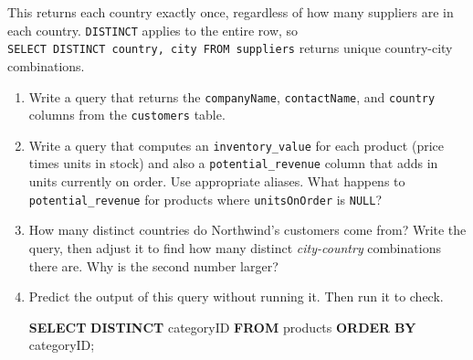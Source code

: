 \documentclass[
  letterpaper,
  DIV=11,
  numbers=noendperiod]{scrreprt}
\newenvironment{Shaded}{\begin{snugshade}}{\end{snugshade}}
\newcommand{\KeywordTok}[1]{\textcolor[rgb]{0.00,0.23,0.31}{\textbf{#1}}}
\newcommand{\NormalTok}[1]{\textcolor[rgb]{0.00,0.23,0.31}{#1}}
\begin{document}
This returns each country exactly once, regardless of how many suppliers
are in each country. \texttt{DISTINCT} applies to the entire row, so
\texttt{SELECT\ DISTINCT\ country,\ city\ FROM\ suppliers} returns
unique country-city combinations.

\begin{tcolorbox}[enhanced jigsaw, opacitybacktitle=0.6, arc=.35mm, colback=white, bottomtitle=1mm, opacityback=0, toprule=.15mm, left=2mm, colbacktitle=quarto-callout-note-color!10!white, breakable, coltitle=black, toptitle=1mm, colframe=quarto-callout-note-color-frame, bottomrule=.15mm, titlerule=0mm, title=\textcolor{quarto-callout-note-color}{\faInfo}\hspace{0.5em}{Exercises}, rightrule=.15mm, leftrule=.75mm]

\begin{enumerate}
\def\labelenumi{\arabic{enumi}.}
\item
  Write a query that returns the \texttt{companyName},
  \texttt{contactName}, and \texttt{country} columns from the
  \texttt{customers} table.
\item
  Write a query that computes an \texttt{inventory\_value} for each
  product (price times units in stock) and also a
  \texttt{potential\_revenue} column that adds in units currently on
  order. Use appropriate aliases. What happens to
  \texttt{potential\_revenue} for products where \texttt{unitsOnOrder}
  is \texttt{NULL}?
\item
  How many distinct countries do Northwind's customers come from? Write
  the query, then adjust it to find how many distinct
  \emph{city-country} combinations there are. Why is the second number
  larger?
\item
  Predict the output of this query without running it. Then run it to
  check.

  \begin{codelisting}

  \caption{\texttt{duckdb}}

\begin{Shaded}
\begin{Highlighting}[]
\KeywordTok{SELECT} \KeywordTok{DISTINCT}\NormalTok{ categoryID}
\KeywordTok{FROM}\NormalTok{ products}
\KeywordTok{ORDER} \KeywordTok{BY}\NormalTok{ categoryID;}
\end{Highlighting}
\end{Shaded}

  \end{codelisting}
\end{enumerate}

\end{tcolorbox}
\end{document}
